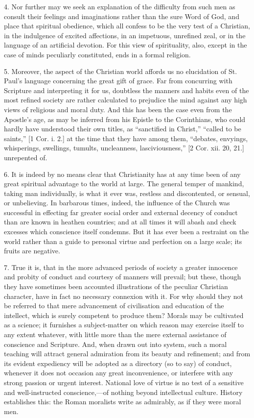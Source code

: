 4. Nor further may we seek an explanation of the difficulty from
such men as consult their feelings and imaginations rather than the
sure Word of God, and place that spiritual obedience, which all
confess to be the very test of a Christian, in the indulgence of
excited affections, in an impetuous, unrefined zeal, or in the
language of an artificial devotion. For this view of spirituality,
also, except in the case of minds peculiarly constituted, ends in a
formal religion.

5. Moreover, the aspect of the Christian world affords us no
elucidation of St. Paul's language concerning the great gift of grace.
Far from concurring with Scripture and interpreting it for us,
doubtless the manners and habits even of the most refined society are
rather calculated to prejudice the mind against any high views of
religious and moral duty. And this has been the case even from the
Apostle's age, as may be inferred from his Epistle to the Corinthians,
who could hardly have understood their own titles, as ``sanctified
in Christ,'' ``called to be saints,'' [1 Cor. i. 2.] at
the time that they have among them, ``debates, envyings,
whisperings, swellings, tumults, uncleanness, lasciviousness,'' [2
Cor. xii. 20, 21.] unrepented of.

6. It is indeed by no means clear that Christianity has at any time
been of any great spiritual advantage to the world at large. The
general temper of mankind, taking man individually, is what it ever
was, restless and discontented, or sensual, or unbelieving. In
barbarous times, indeed, the influence of the Church was successful in
effecting far greater social order and external decency of conduct
than are known in heathen countries; and at all times it will abash
and check excesses which conscience itself condemns. But it has ever
been a restraint on the world rather than a guide to personal virtue
and perfection on a large scale; its fruits are negative.

7. True it is, that in the more advanced periods of society a
greater innocence and probity of conduct and courtesy of manners will
prevail; but these, though they have sometimes been accounted
illustrations of the peculiar Christian character, have in fact no
necessary connexion with it. For why should they not be referred to
that mere advancement of civilisation and education of the intellect,
which is surely competent to produce them? Morals may be cultivated as
a science; it furnishes a subject-matter on which reason may exercise
itself to any extent whatever, with little more than the mere external
assistance of conscience and Scripture. And, when drawn out into
system, such a moral teaching will attract general admiration from its
beauty and refinement; and from its evident expediency will be adopted
as a directory (so to say) of conduct, whenever it does not occasion
any great inconvenience, or interfere with any strong passion or
urgent interest. National love of virtue is no test of a sensitive and
well-instructed conscience,—of nothing beyond intellectual culture.
History establishes this: the Roman moralists write as admirably, as
if they were moral men.

